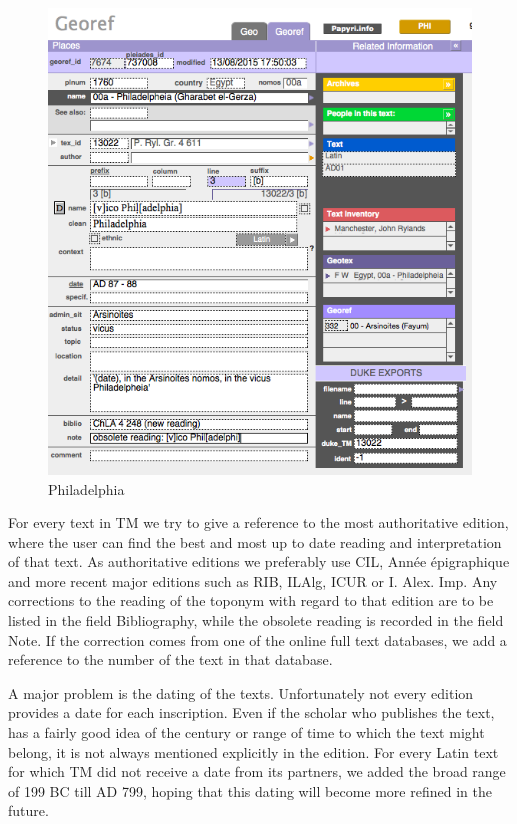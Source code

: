 \documentclass[amsthm,ebook]{saparticle}
\begin{document}
\begin{figure}[!hbp]
\centering
 \includegraphics[width=\columnwidth]{EAGLE2016FullPaperVerreth-img003.png}
\caption{Philadelphia}
\label{fig:3}
\end{figure}
 

For every text in TM we try to give a reference to the most authoritative edition, where the user can find the best
and most up to date reading and interpretation of that text. As authoritative editions we preferably use CIL, Année
épigraphique and more recent major editions such as RIB, ILAlg, ICUR or I. Alex. Imp. Any corrections to the reading of
the toponym with regard to that edition are to be listed in the field Bibliography, while the obsolete reading is
recorded in the field Note. If the correction comes from one of the online full text databases, we add a reference to
the number of the text in that database.

A major problem is the dating of the texts. Unfortunately not every edition provides a date for each inscription.
Even if the scholar who publishes the text, has a fairly good idea of the century or range of time to which the text
might belong, it is not always mentioned explicitly in the edition. For every Latin text for which TM did not receive a
date from its partners, we added the broad range of 199 BC till AD 799, hoping that this dating will become more
refined in the future.
\end{document}
